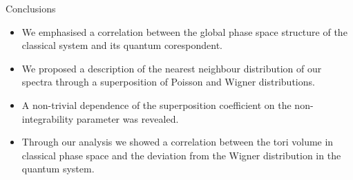 \documentclass[a4,compress]{beamer}
\begin{document}
\begin{frame}{Conclusions}
  \begin{itemize}
    \item We emphasised a correlation between the global phase space
    structure of the classical system and its quantum corespondent.
    \item We proposed a description of the nearest neighbour distribution of
    our spectra through a superposition of Poisson and Wigner distributions.
    \item A non-trivial dependence of the superposition coefficient on the
    non-integrability parameter was revealed.
    \item Through our analysis we showed a correlation between the tori volume
    in classical phase space and the deviation from the Wigner distribution
    in the quantum system.
  \end{itemize}
\end{frame}
\end{document}
